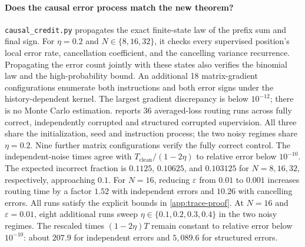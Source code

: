 \paragraph{Does the causal error process match the new theorem?}
\texttt{causal\_credit.py} propagates the exact finite-state law of the prefix sum and final sign.
For $\eta=0.2$ and $N\in\{8,16,32\}$, it checks every supervised position's local error rate, cancellation coefficient, and the cancelling variance recurrence.
Propagating the error count jointly with these states also verifies the binomial law and the high-probability bound.
An additional 18 matrix-gradient configurations enumerate both instructions and both error signs under the history-dependent kernel.
The largest gradient discrepancy is below $10^{-12}$; there is no Monte Carlo estimation.
 reports 36 averaged-loss routing runs across fully correct, independently corrupted and structured corrupted supervision.
All three share the initialization, seed and instruction process; the two noisy regimes share $\eta=0.2$.
Nine further matrix configurations verify the fully correct control.
The independent-noise times agree with $T_{\mathrm{clean}}/(1-2\eta)$ to relative error below $10^{-10}$.
The expected incorrect fraction is $0.1125$, $0.10625$, and $0.103125$ for $N=8,16,32$, respectively, approaching $0.1$.
For $N=16$, reducing $\varepsilon$ from $0.01$ to $0.001$ increases routing time by a factor $1.52$ with independent errors and $10.26$ with cancelling errors.
All runs satisfy the explicit bounds in \cref{app:trace-proof}.
At $N=16$ and $\varepsilon=0.01$, eight additional runs sweep $\eta\in\{0.1,0.2,0.3,0.4\}$ in the two noisy regimes.
The rescaled times $(1-2\eta)T$ remain constant to relative error below $10^{-10}$: about $207.9$ for independent errors and $5{,}089.6$ for structured errors.

\begin{table}[t]
\centering\small
\caption{\textbf{Correct computation from clean and corrupted reasoning supervision.} The clean control has no errors; both noisy regimes have local error rate $\eta=0.2$.
The same block parameters train on all $N$ selected positions. Times reach source attention $\tfrac{1}{2}$ on every prefix; the final column compares structured errors with clean supervision.}
\label{tab:causal-flow}

\end{table}

